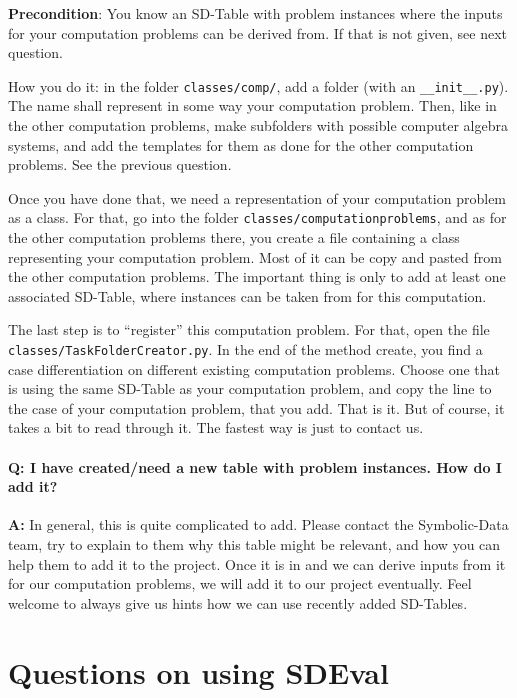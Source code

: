 \documentclass[11pt,a4paper]{amsart}
\numberwithin{equation}{section}
\theoremstyle{definition}
\begin{document}
\textbf{Precondition}: You know an SD-Table with problem instances where the inputs for your computation problems can be derived from. If that is not given, see next question.

How you do it: in the folder \texttt{classes/comp/}, add a folder (with an \texttt{\_\_init\_\_.py}). The name shall represent in some way your computation problem. Then, like in the other computation problems, make subfolders with possible computer algebra systems, and add the templates for them as done for the other computation problems. See the previous question.

Once you have done that, we need a representation of your computation problem as a class. For that, go into the folder \texttt{classes/computationproblems}, and as for the other computation problems there, you create a file containing a class representing your computation problem. Most of it can be copy and pasted from the other computation problems. The important thing is only to add at least one associated SD-Table, where instances can be taken from for this computation.

The last step is to ``register'' this computation problem. For that, open the file \texttt{classes/TaskFolderCreator.py}. In the end of the method create, you find a case differentiation on different existing computation problems. Choose one that is using the same SD-Table as your computation problem, and copy the line to the case of your computation problem, that you add. That is it. But of course, it takes a bit to read through it. The fastest way is just to contact us.

\paragraph{\textbf{Q:} I have created/need a new table with problem instances. How do I add it?}
\textbf{A:} In general, this is quite complicated to add. Please contact the Symbolic-Data team, try to explain to them why this table might be relevant, and how you can help them to add it to the project. Once it is in and we can derive inputs from it for our computation problems, we will add it to our project eventually. Feel welcome to always give us hints how we can use recently added SD-Tables.

\section{Questions on using SDEval}
\end{document}
